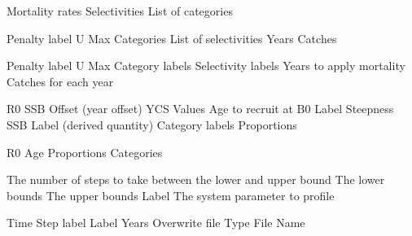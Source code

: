  {Mortality rates}
 {Selectivities}
 {List of categories}
\par\textbf{}\par
{} {Penalty label}
 {U Max}
 {Categories}
 {List of selectivities}
 {Years}
 {Catches}
\par\textbf{}\par
{} {Penalty label}
 {U Max}
 {Category labels}
 {Selectivity labels}
 {Years to apply mortality}
 {Catches for each year}
\par\textbf{}\par
{} {R0}
 {SSB Offset (year offset)}
 {}
 {YCS Values}
 {Age to recruit at}
 {B0 Label}
 {Steepness}
 {SSB Label (derived quantity)}
 {Category labels}
 {Proportions}
\par\textbf{}\par
{} {R0}
 {Age}
 {Proportions}
 {Categories}
\par\par
{} {The number of steps to take between the lower and upper bound}
 {The lower bounds}
 {The upper bounds}
 {Label}
 {The system parameter to profile}
\par\par
{} {Time Step label}
 {Label}
 {Years}
 {Overwrite file}
 {Type}
 {File Name}
\par\textbf{}\par
\par\textbf{}\par
\par\textbf{}\par
